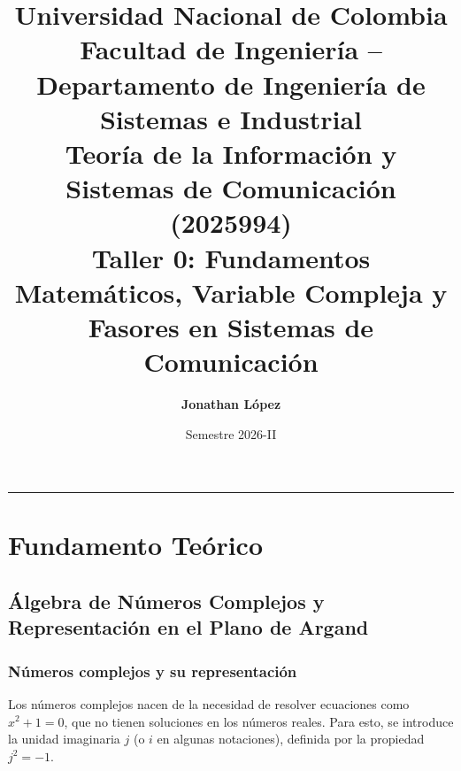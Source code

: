 \documentclass[11pt,a4paper]{article}
\title{\textbf{Universidad Nacional de Colombia}\\[0.2em]
\large Facultad de Ingeniería -- Departamento de Ingeniería de Sistemas e Industrial\\[0.8em]
\Large \textbf{Teoría de la Información y Sistemas de Comunicación (2025994)}\\[0.4em]
\large \textbf{Taller 0: Fundamentos Matemáticos, Variable Compleja y Fasores en Sistemas de Comunicación}}
\author{\textbf{Jonathan López}}
\date{Semestre 2026-II}
\begin{document}
\maketitle
\thispagestyle{fancy}

\vspace{1em}
\hrule
\vspace{1.5em}

\section{Fundamento Teórico}

\subsection{Álgebra de Números Complejos y Representación en el Plano de Argand}
\subsubsection{Números complejos y su representación}
Los números complejos nacen de la necesidad de resolver ecuaciones como $x^2 + 1 = 0$, que no tienen soluciones en los números reales. Para esto, se introduce la unidad imaginaria \( j \) (o \( i \) en algunas notaciones), definida por la propiedad \( j^2 = -1 \). 
\end{document}

